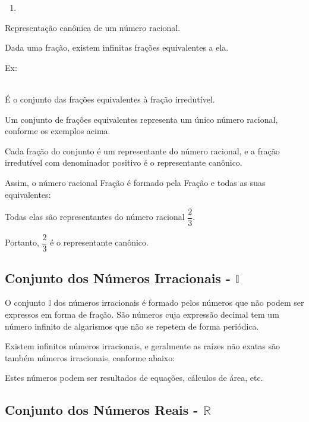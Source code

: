 \begin{multicols*}{2}
\begin{enumerate}
\item {}  

\end{enumerate}

Representação canônica de um número racional.

Dada uma fração, existem infinitas frações equivalentes a ela.

Ex:

\\

É o conjunto das frações equivalentes à fração irredutível.

Um conjunto de frações equivalentes representa um único número racional, conforme os exemplos acima.

Cada fração do conjunto é um representante do número racional, e a fração irredutível com denominador positivo é o representante canônico.

Assim, o número racional Fração é formado pela Fração e todas as suas equivalentes:

Todas elas são representantes do número racional $\dfrac{2}{3} $.

Portanto, $ \dfrac{2}{3} $ é o representante canônico.\\
	
	\subsection{Conjunto dos Números Irracionais - $\mathbb{I}$}
	
	O conjunto $\mathbb{I}$ dos números irracionais é formado pelos números que não podem ser expressos em forma de fração. São números cuja expressão decimal tem um número infinito de algarismos que não se repetem de forma periódica.
	
	Existem infinitos números irracionais, e geralmente as raízes não exatas são também números irracionais, conforme abaixo:
	
	
	Estes números podem ser resultados de equações, cálculos de área, etc.
	
	\subsection{Conjunto dos Números Reais - $\mathbb{R}$}
	

\end{multicols*}

